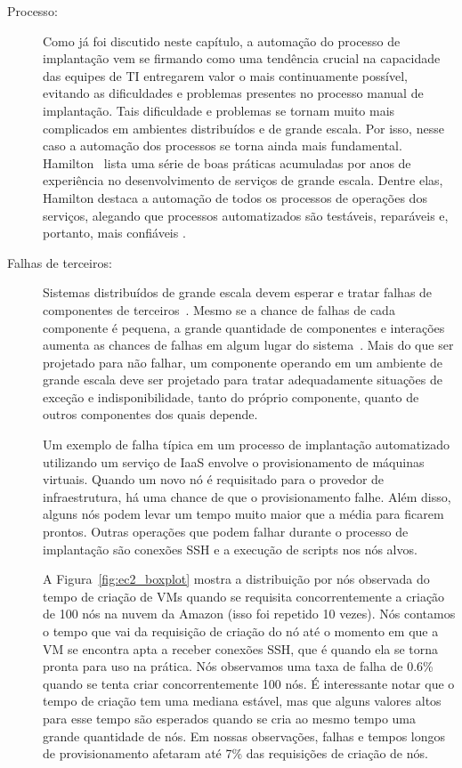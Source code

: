 \begin{description}

\item [Processo:]

Como já foi discutido neste capítulo, a automação do processo de implantação
vem se firmando como uma tendência crucial na capacidade
das equipes de TI entregarem valor o mais continuamente possível,
evitando as dificuldades e problemas presentes no processo manual de implantação.
Tais dificuldade e problemas se tornam muito mais complicados em ambientes distribuídos
e de grande escala. Por isso, nesse caso a automação dos processos se torna
ainda mais fundamental.
Hamilton~\cite{Hamilton2007InternetScale} lista uma série de boas práticas acumuladas 
por anos de experiência no desenvolvimento de serviços de grande escala.
Dentre elas, Hamilton destaca a automação de todos os processos de operações dos serviços,
alegando que processos automatizados são testáveis, reparáveis e, portanto,
mais confiáveis .

\item [Falhas de terceiros:] 

Sistemas distribuídos de grande escala devem esperar e tratar falhas
de componentes de terceiros~\cite{Hamilton2007InternetScale,Helland2009Quicksand,CarnegieMellon2006ULS}.
Mesmo se a chance de falhas de cada componente é pequena,
a grande quantidade de componentes e interações aumenta as chances de 
falhas em algum lugar do sistema~\cite{CarnegieMellon2006ULS}.
Mais do que ser projetado para não falhar, um componente operando em um ambiente  de grande escala deve ser projetado para tratar adequadamente situações de exceção e indisponibilidade, tanto do próprio componente, quanto de outros componentes dos quais depende.

Um exemplo de falha típica em um processo de implantação automatizado
utilizando um serviço de IaaS envolve o provisionamento de máquinas virtuais.
Quando um novo nó é requisitado para o provedor de infraestrutura,
há uma chance de que o provisionamento falhe.
Além disso, alguns nós podem levar um tempo muito maior que a média para ficarem prontos.
Outras operações que podem falhar durante o processo de implantação são
conexões SSH e a execução de scripts nos nós alvos.

A Figura~\ref{fig:ec2_boxplot} mostra a distribuição por nós observada
do tempo de criação de VMs quando se requisita concorrentemente a criação
de 100 nós na nuvem da Amazon (isso foi repetido 10 vezes).
Nós contamos o tempo que vai da requisição de criação do nó
até o momento em que a VM se encontra apta a receber conexões SSH,
que é quando ela se torna pronta para uso na prática.
Nós observamos uma taxa de falha de 0.6\%
quando se tenta criar concorrentemente 100 nós.
É interessante notar que o tempo de criação tem uma mediana estável,
mas que alguns valores altos para esse tempo são esperados quando
se cria ao mesmo tempo uma grande quantidade de nós.
Em nossas observações, falhas e tempos longos de provisionamento
afetaram até 7\% das requisições de criação de nós.


\end{description}
